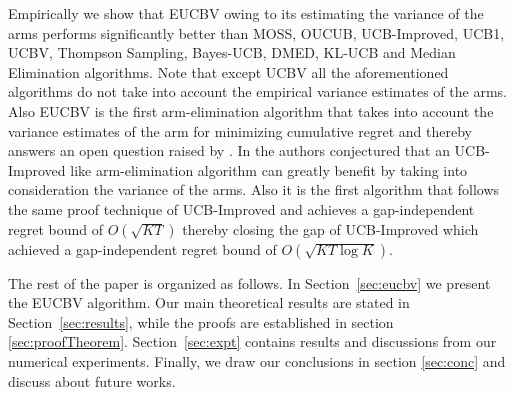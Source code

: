 Empirically we show that EUCBV owing to its estimating the variance of the arms performs significantly better than MOSS, OUCUB, UCB-Improved, UCB1, UCBV, Thompson Sampling, Bayes-UCB, DMED, KL-UCB and Median Elimination algorithms. Note that except UCBV all the aforementioned algorithms do not take into account the empirical variance estimates of the arms. Also EUCBV is the first arm-elimination algorithm that takes into account the variance estimates of the arm for minimizing cumulative regret and thereby answers an open question raised by \cite{auer2010ucb}. In \cite{auer2010ucb} the authors conjectured that an UCB-Improved like arm-elimination algorithm can greatly benefit by taking into consideration the variance of the arms. Also it is the first algorithm that follows the same proof technique of UCB-Improved and achieves a gap-independent regret bound of $O\left( \sqrt{KT} \right)$ thereby closing the gap of UCB-Improved \cite{auer2010ucb} which achieved a gap-independent regret bound of $O\left( \sqrt{KT\log K} \right)$. 
	
	The rest of the paper is organized as follows. In Section~\ref{sec:eucbv} we present the  EUCBV algorithm. Our main theoretical results are stated in Section~\ref{sec:results}, while the proofs are established in   section \ref{sec:proofTheorem}. Section~\ref{sec:expt} contains results and discussions from our numerical experiments. Finally, we draw our conclusions in section \ref{sec:conc} and discuss about future works.
	
	
	